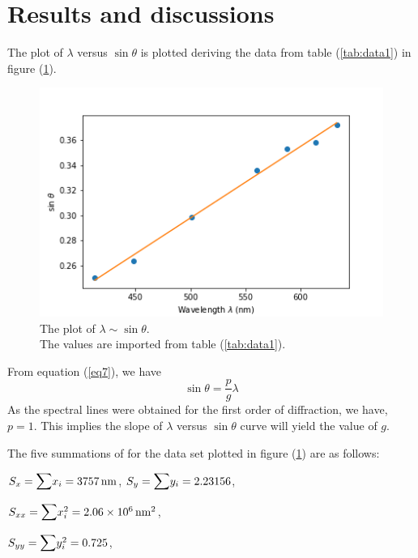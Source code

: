 \documentclass[%
 reprint,
 amsmath,amssymb,
 aps,
]{revtex4-2}
\begin{document}
\section{Results and discussions}
    The plot of $\lambda$ versus $\sin \theta$ is plotted deriving the data from table (\ref{tab:data1}) in figure (\ref{fig:plot-1}).
    \begin{figure}
        \centering
        \includegraphics[scale = 0.55]{Figures/plot-1.png}
        \caption{The plot of $\lambda \sim \sin \theta$.\\ The values are imported from table (\ref{tab:data1}).}
        \label{fig:plot-1}
    \end{figure}
    From equation (\ref{eq7}), we have
    \begin{equation}
        \sin \theta = \dfrac{p}{g} \lambda
    \end{equation}
    As the spectral lines were obtained for the first order of diffraction, we have, $p = 1$.
    This implies the slope of $\lambda$ versus $\sin \theta$ curve will yield the value of $g$.
    \par
    The five summations of for the data set plotted in figure (\ref{fig:plot-1}) are as follows:
    \par
    \vspace{0.5cm}
    $S_{x} = \mathlarger{\mathlarger{\sum}} x_{i} = \SI{3757}{\nano \metre}$, \hspace{0.5cm} $S_{y} = \mathlarger{\mathlarger{\sum}} y_{i} = 2.23156$,
    \par
    \vspace{0.5cm}
    $S_{xx} = \mathlarger{\mathlarger{\sum}} x_{i}^2 = \SI{2.06e6}{\nano \metre \squared}$,
    \par
    \vspace{0.5cm}
    $S_{yy} = \mathlarger{\mathlarger{\sum}} y_{i}^2 = 0.725$,
\end{document}
